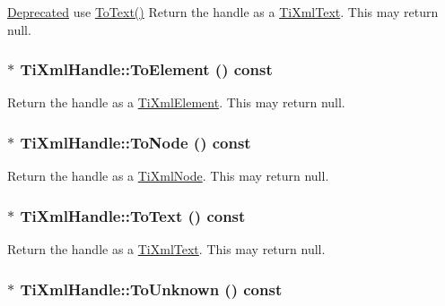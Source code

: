 \begin{Desc}
\item[\hyperlink{deprecated__deprecated000003}{Deprecated}]use \hyperlink{class_ti_xml_handle_a4ac53a652296203a5b5e13854d923586}{ToText()} Return the handle as a \hyperlink{class_ti_xml_text}{TiXmlText}. This may return null. \end{Desc}
\hypertarget{class_ti_xml_handle_abc6e7ed383a5fe1e52b0c0004b457b9e}{
\subsubsection[{ToElement}]{$\ast$ TiXmlHandle::ToElement () const}}
\label{class_ti_xml_handle_abc6e7ed383a5fe1e52b0c0004b457b9e}
Return the handle as a \hyperlink{class_ti_xml_element}{TiXmlElement}. This may return null. \hypertarget{class_ti_xml_handle_af678e5088e83be67baf76f699756f2c3}{
\subsubsection[{ToNode}]{$\ast$ TiXmlHandle::ToNode () const}}
\label{class_ti_xml_handle_af678e5088e83be67baf76f699756f2c3}
Return the handle as a \hyperlink{class_ti_xml_node}{TiXmlNode}. This may return null. \hypertarget{class_ti_xml_handle_a4ac53a652296203a5b5e13854d923586}{
\subsubsection[{ToText}]{$\ast$ TiXmlHandle::ToText () const}}
\label{class_ti_xml_handle_a4ac53a652296203a5b5e13854d923586}
Return the handle as a \hyperlink{class_ti_xml_text}{TiXmlText}. This may return null. \hypertarget{class_ti_xml_handle_a1381c17507a130767b1e23afc93b3674}{
\subsubsection[{ToUnknown}]{$\ast$ TiXmlHandle::ToUnknown () const}}
